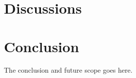 \documentclass[10pt,journal,compsoc]{IEEEtran}
\begin{document}
\section{Discussions}
\label{sec:discuss}

\section{Conclusion}
\label{sec:conclude}
The conclusion and future scope goes here.






%





\ifCLASSOPTIONcompsoc
\end{document}
